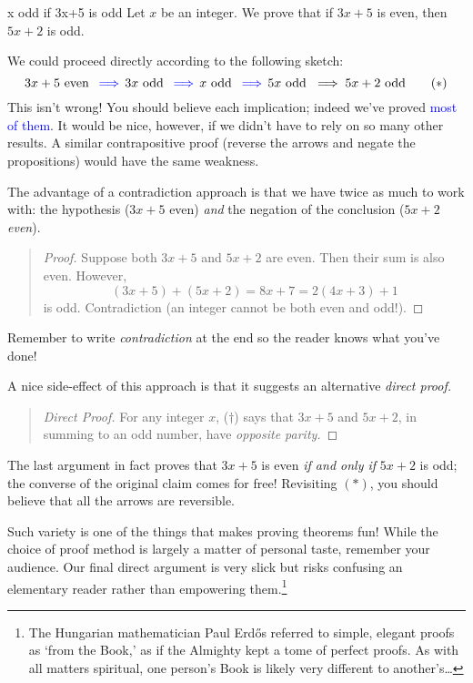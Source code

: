 \begin{example}{}{x odd if 3x+5 is odd}
	Let $x$ be an integer. We prove that if $3x+5$ is even, then $5x+2$ is odd.\medbreak

	We could proceed directly according to the following sketch:
	\[
		3x+5\text{ even }\operatorname{\textcolor{blue}{\implies}} 3x\text{ odd }\operatorname{\textcolor{blue}{\implies}} x\text{ odd }\operatorname{\textcolor{blue}{\implies}} 5x\text{ odd }\implies 5x+2\text{ odd} \tag{$\ast$}
	\]
	This isn't wrong! You should believe each implication; indeed we've proved \textcolor{blue}{most of them}. It would be nice, however, if we didn't have to rely on so many other results. A similar contrapositive proof (reverse the arrows and negate the propositions) would have the same weakness.\medbreak
	
	The advantage of a contradiction approach is that we have twice as much to work with: the hypothesis ($3x+5$ even) \emph{and} the negation of the conclusion ($5x+2$ \emph{even}).
	
	\begin{quote}
		\begin{proof}
			Suppose both $3x+5$ and $5x+2$ are even. Then their sum is also even. However,
		  \[
		  	(3x+5)+(5x+2)=8x+7=2(4x+3)+1 \tag{$\dag$}
		  \]
		  is odd. Contradiction (an integer cannot be both even and odd!).
		\end{proof}
	\end{quote}
	
	Remember to write \emph{contradiction} at the end so the reader knows what you've done!\smallbreak
	
	A nice side-effect of this approach is that it suggests an alternative \emph{direct proof.}
	
	\begin{quote}
		\begin{proof}[Direct Proof]
			For any integer $x$, ($\dag$) says that $3x+5$ and $5x+2$, in summing to an odd number, have \emph{opposite parity.}
		\end{proof}
	\end{quote}
	
	The last argument in fact proves that $3x+5$ is even \emph{if and only if} $5x+2$ is odd; the converse of the original claim comes for free! Revisiting $(\ast)$, you should believe that all the arrows are reversible.
\end{example}


\goodbreak


Such variety is one of the things that makes proving theorems fun! While the choice of proof method is largely a matter of personal taste, remember your audience. Our final direct argument is very slick but risks confusing an elementary reader rather than empowering them.\footnote{The Hungarian mathematician Paul Erdős referred to simple, elegant proofs as `from the Book,' as if the  Almighty kept a tome of perfect proofs. As with all matters spiritual, one person's Book is likely very different to another's\ldots} 



